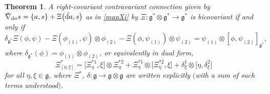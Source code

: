 \documentclass[pdftex]{sigma}
\numberwithin{equation}{section}
\newtheorem{Theorem}{Theorem}[section]
\newcommand{\<}{{\langle}}
\renewcommand{\>}{{\rangle}}
\newcommand{\tens}{\otimes}
\newcommand{\extd}{{\rm d}}
\newcommand{\cg}{{\mathfrak{g}}}
\begin{document}
\begin{Theorem}\label{bicovXi} A right-covariant contravariant connection given by $\tilde\nabla_{\extd a}s=\{a,s\}+\Xi\big(\tilde{\extd a},s\big)$ as in \eqref{mapXi} by $\Xi\colon \cg^*\tens \cg^*\to \cg^*$ is bicovariant if and only if
\begin{equation*}%
\delta_{\mathfrak{g}^*}\Xi(\phi,\psi)-\Xi(\phi_{(1)},\psi)\tens\phi_{(2)}-\Xi(\phi,\psi_{(1)})\tens\psi_{(2)}=\psi_{(1)}\tens [\phi,\psi_{(2)}]_{\cg^*}, \end{equation*}
where $\delta_{\mathfrak{g}^*}(\phi)=\phi_{(1)}\tens\phi_{(2)}$, or equivalently in dual form,
\begin{equation*}%
 \Xi^*_{[\eta,\xi]}= \big[\Xi^{*1}_\eta,\xi\big]\tens\Xi_\eta^{*2}+ \Xi^{*1}_\eta \tens\big[ \Xi_\eta^{*2},\xi\big] +\delta^1_\xi\tens \big[\eta,\delta^2_\xi\big]
\end{equation*}
for all $\eta,\xi\in \cg$, where $\Xi^*$, $\delta\colon \cg\to \cg\tens\cg$ are written explicitly $($with a sum of such terms understood$)$.
\end{Theorem}
\end{document}
